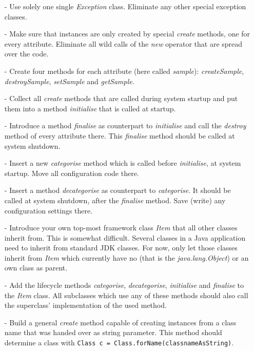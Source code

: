 \begin{itemize}
    \item[-] Use solely one single \emph{Exception} class. Eliminate any other
        special exception classes.
    \item[-] Make sure that instances are only created by special \emph{create}
        methods, one for every attribute. Eliminate all wild calls of the \emph{new}
        operator that are spread over the code.
    \item[-] Create four methods for each attribute (here called \emph{sample}):
        \emph{createSample}, \emph{destroySample}, \emph{setSample} and
        \emph{getSample}.
    \item[-] Collect all \emph{create} methods that are called during system
        startup and put them into a method \emph{initialise} that is called at
        startup.
    \item[-] Introduce a method \emph{finalise} as counterpart to \emph{initialise}
        and call the \emph{destroy} method of every attribute there. This
        \emph{finalise} method should be called at system shutdown.
    \item[-] Insert a new \emph{categorise} method which is called before
        \emph{initialise}, at system startup. Move all configuration code there.
    \item[-] Insert a method \emph{decategorise} as counterpart to \emph{categorise}.
        It should be called at system shutdown, after the \emph{finalise} method.
        Save (write) any configuration settings there.
    \item[-] Introduce your own top-most framework class \emph{Item} that all
        other classes inherit from. This is somewhat difficult. Several classes
        in a Java application need to inherit from standard JDK classes. For now,
        only let those classes inherit from \emph{Item} which currently have
        no (that is the \emph{java.lang.Object}) or an own class as parent.
    \item[-] Add the lifecycle methods \emph{categorise}, \emph{decategorise},
        \emph{initialise} and \emph{finalise} to the \emph{Item} class.
        All subclasses which use any of these methods should also call the
        superclass' implementation of the used method.
    \item[-] Build a general \emph{create} method capable of creating instances
        from a class name that was handed over as string parameter. This method
        should determine a class with \texttt{Class c = Class.forName(classnameAsString)}.

\end{itemize}
